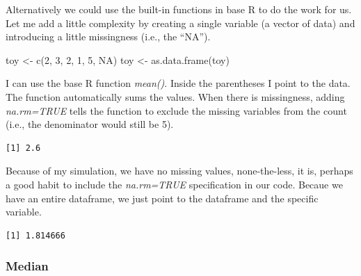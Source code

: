 \documentclass[
  11pt,
]{book}
\newenvironment{Shaded}{\begin{snugshade}}{\end{snugshade}}
\newcommand{\AttributeTok}[1]{\textcolor[rgb]{0.77,0.63,0.00}{#1}}
\newcommand{\ConstantTok}[1]{\textcolor[rgb]{0.00,0.00,0.00}{#1}}
\newcommand{\DecValTok}[1]{\textcolor[rgb]{0.00,0.00,0.81}{#1}}
\newcommand{\FunctionTok}[1]{\textcolor[rgb]{0.00,0.00,0.00}{#1}}
\newcommand{\NormalTok}[1]{#1}
\newcommand{\OtherTok}[1]{\textcolor[rgb]{0.56,0.35,0.01}{#1}}
\newcommand{\SpecialCharTok}[1]{\textcolor[rgb]{0.00,0.00,0.00}{#1}}
\begin{document}
Alternatively we could use the built-in functions in base R to do the work for us. Let me add a little complexity by creating a single variable (a vector of data) and introducing a little missingness (i.e., the ``NA'').

\begin{Shaded}
\begin{Highlighting}[]
\NormalTok{toy }\OtherTok{\textless{}{-}} \FunctionTok{c}\NormalTok{(}\DecValTok{2}\NormalTok{, }\DecValTok{3}\NormalTok{, }\DecValTok{2}\NormalTok{, }\DecValTok{1}\NormalTok{, }\DecValTok{5}\NormalTok{, }\ConstantTok{NA}\NormalTok{)}
\NormalTok{toy }\OtherTok{\textless{}{-}} \FunctionTok{as.data.frame}\NormalTok{(toy)}
\end{Highlighting}
\end{Shaded}

I can use the base R function \emph{mean()}. Inside the parentheses I point to the data. The function automatically sums the values. When there is missingness, adding \emph{na.rm=TRUE} tells the function to exclude the missing variables from the count (i.e., the denominator would still be 5).

\begin{Shaded}
\end{Shaded}

\begin{verbatim}
[1] 2.6
\end{verbatim}

Because of my simulation, we have no missing values, none-the-less, it is, perhaps a good habit to include the \emph{na.rm=TRUE} specification in our code. Becaue we have an entire dataframe, we just point to the dataframe and the specific variable.

\begin{Shaded}
\end{Shaded}

\begin{verbatim}
[1] 1.814666
\end{verbatim}

\hypertarget{median}{%
\subsubsection{Median}\label{median}}
\end{document}

